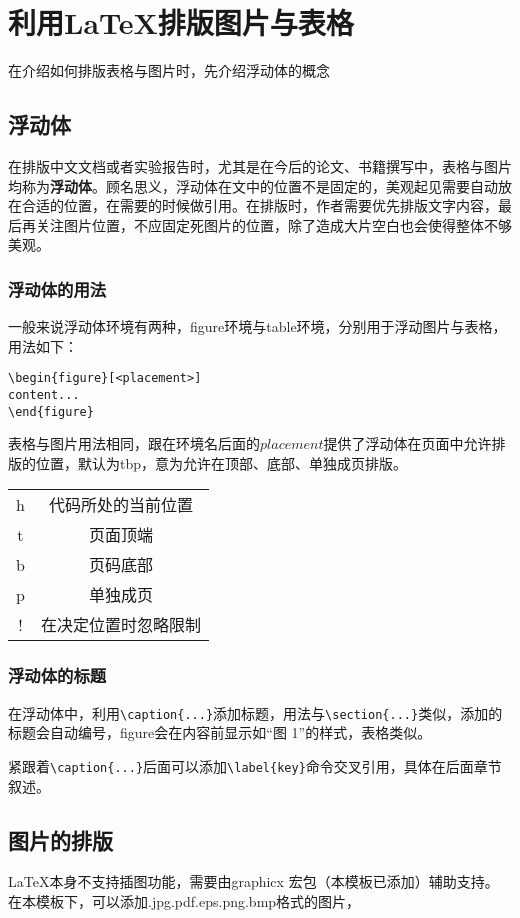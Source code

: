 \section{利用\LaTeX 排版图片与表格}
在介绍如何排版表格与图片时，先介绍浮动体的概念
\subsection{浮动体}
在排版中文文档或者实验报告时，尤其是在今后的论文、书籍撰写中，表格与图片均称为\textbf{浮动体}。顾名思义，浮动体在文中的位置不是固定的，美观起见需要自动放在合适的位置，在需要的时候做引用。在排版时，作者需要优先排版文字内容，最后再关注图片位置，不应固定死图片的位置，除了造成大片空白也会使得整体不够美观。
\subsubsection{浮动体的用法}
一般来说浮动体环境有两种，figure环境与table环境，分别用于浮动图片与表格，用法如下：
\begin{verbatim}
\begin{figure}[<placement>]
content...
\end{figure}
\end{verbatim}

表格与图片用法相同，跟在环境名后面的$placement$提供了浮动体在页面中允许排版的位置，默认为tbp，意为允许在顶部、底部、单独成页排版。
\begin{table}[h!]
\centering
\begin{tabular}{cc}
\hline
h&代码所处的当前位置\\
t&页面顶端\\
b&页码底部\\
p&单独成页\\
!&在决定位置时忽略限制\\
\hline
\end{tabular}
\end{table}
\subsubsection{浮动体的标题}
在浮动体中，利用\verb|\caption{...}|添加标题，用法与\verb|\section{...}|类似，添加的标题会自动编号，figure会在内容前显示如“图 1”的样式，表格类似。

紧跟着\verb|\caption{...}|后面可以添加\verb|\label{key}|命令交叉引用，具体在后面章节叙述。
\subsection{图片的排版}
\LaTeX 本身不支持插图功能，需要由graphicx 宏包（本模板已添加）辅助支持。在本模板下，可以添加.jpg.pdf.eps.png.bmp格式的图片，

